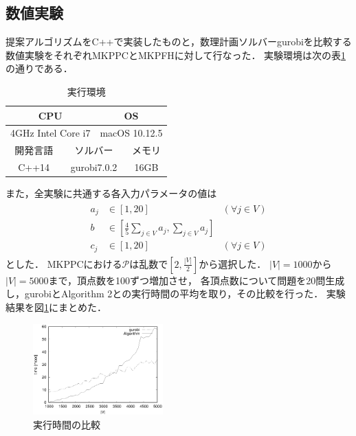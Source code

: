 \documentclass[twocolumn,10pt,dvipdfmx]{jarticle}
\numberwithin{equation}{section}
\begin{document}
	\subsection{数値実験}
    提案アルゴリズムをC++で実装したものと，数理計画ソルバーgurobiを比較する数値実験をそれぞれMKPPCとMKPFHに対して行なった．
    実験環境は次の表\ref{kankyou}の通りである．\par
    \begin{table}[htb]
		\begin{center}
			\caption{実行環境}
				\begin{tabular}{|c|c|c|c|c|c|} \hline
					\multicolumn{3}{|c|}{CPU}  & \multicolumn{3}{|c|}{OS} \\ \hline
					\multicolumn{3}{|c|}{4GHz Intel Core i7} & \multicolumn{3}{|c|}{macOS 10.12.5}\\ \hline
					\multicolumn{2}{|c|}{開発言語} & \multicolumn{2}{|c|}{ソルバー} & \multicolumn{2}{|c|}{メモリ}\\ \hline
					\multicolumn{2}{|c|}{C++14} & \multicolumn{2}{|c|}{gurobi7.0.2} & \multicolumn{2}{|c|}{16GB}\\ \hline
				\end{tabular}
			\label{kankyou}
		\end{center}
	\end{table}
    また，全実験に共通する各入力パラメータの値は
    \begin{align}
        \begin{array}{rll}
            a_j &\in [1,20] & (\forall j\in V)\\ 
            b &\in \left[\displaystyle\frac{4}{5}\sum_{j\in V}{a_j}, \sum_{j\in V}{a_j}\right] & \\
            c_j &\in [1,20] & (\forall j\in V)
        \end{array}
    \end{align}
    とした．
	MKPPCにおける$\mathcal{P}$は乱数で$[2,\frac{|V|}{2}]$から選択した．
	$|V|=1000$から$|V|=5000$まで，頂点数を100ずつ増加させ，
	各頂点数について問題を20問生成し，gurobiとAlgorithm 2との実行時間の平均を取り，その比較を行った．
	実験結果を図\ref{test1}にまとめた．\par
	\begin{figure}[htbp]
		\begin{center}
			\includegraphics[width=50mm]{jikken1.eps}
		\end{center}
		\caption{実行時間の比較}
		\label{test1}
	\end{figure}
\end{document}
